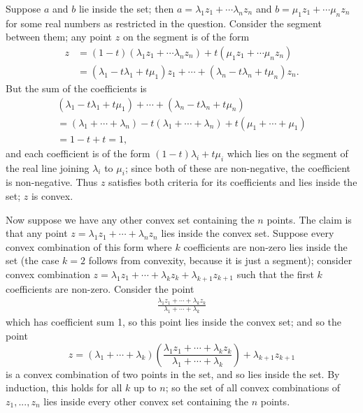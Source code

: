 \documentclass[a4paper,10pt]{article}
\begin{document}
Suppose $ a $ and $ b $ lie inside the set; then $ a = \lambda_1 z_1 + \cdots \lambda_n z_n $ and $ b = \mu_1 z_1 + \cdots \mu_n z_n $ for
some real numbers as restricted in the question. Consider the segment between them; any point $ z $ on the segment is of the form
\begin{align*}
  z &= (1-t)(\lambda_1 z_1 + \cdots \lambda_n z_n) + t(\mu_1 z_1 + \cdots \mu_n z_n)\\
    &= (\lambda_1 - t\lambda_1 + t\mu_1)z_1 + \cdots + (\lambda_n - t\lambda_n + t\mu_n)z_n.
\end{align*}
But the sum of the coefficients is
\begin{multline*}
  (\lambda_1 - t\lambda_1 + t\mu_1) + \cdots + (\lambda_n - t\lambda_n + t\mu_n)\\
    = (\lambda_1 + \cdots + \lambda_n) - t(\lambda_1 + \cdots + \lambda_n) + t(\mu_1 + \cdots + \mu_1)\\
    = 1 - t + t = 1,
\end{multline*}
and each coefficient is of the form $ (1-t)\lambda_i + t\mu_i $ which lies on the segment of the real line joining $ \lambda_i $ to $ \mu_i $;
since both of these are non-negative, the coefficient is non-negative. Thus $ z $ satisfies both criteria for its
coefficients and lies inside the set; $ z $ is convex.

Now suppose we have any other convex set containing the $ n $ points. The claim is that any point $ z = \lambda_1 z_1 + \cdots + \lambda_n z_n $
lies inside the convex set. Suppose every convex combination of this form where $ k $ coefficients are non-zero lies inside the set (the case $ k = 2 $
follows from convexity, because it is just a segment); consider convex combination $ z = \lambda_1 z_1 + \cdots + \lambda_k z_k + \lambda_{k + 1} z_{k + 1} $
such that the first $ k $ coefficients are non-zero. Consider the point
\begin{gather*}
  \frac{\lambda_1 z_1 + \cdots + \lambda_k z_k}{\lambda_1 + \cdots + \lambda_k}
\end{gather*}
which has coefficient sum 1, so this point lies inside the convex set; and so the point
\begin{displaymath}
  z = (\lambda_1 + \cdots + \lambda_k)\left(\frac{\lambda_1 z_1 + \cdots + \lambda_k z_k}{\lambda_1 + \cdots + \lambda_k}\right) + \lambda_{k + 1} z_{k + 1}
\end{displaymath}
is a convex combination of two points in the set, and so lies inside the set. By induction, this holds for all $ k $ up to $ n $;
so the set of all convex combinations of $ z_1,...,z_n $ lies inside every other convex set containing the $ n $
points.
\end{document}
